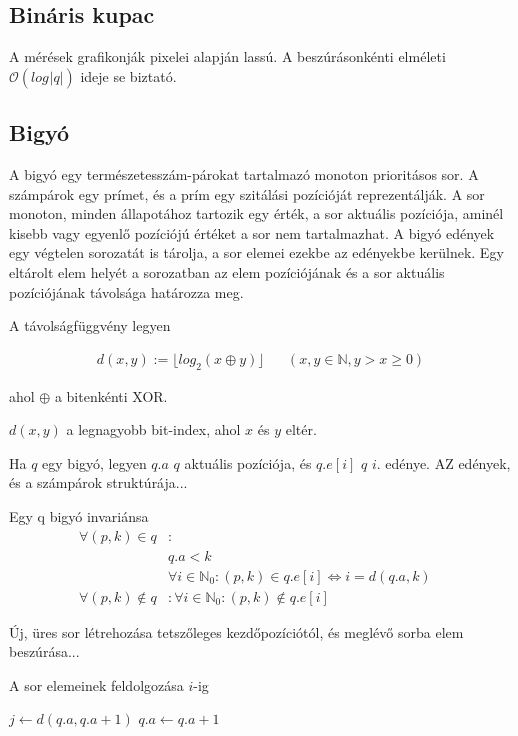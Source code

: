 \documentclass[12pt]{report}
\begin{document}
\subsection{Bináris kupac}

A mérések grafikonják pixelei alapján lassú. A beszúrásonkénti elméleti
$\mathcal{O}(log_{}{|q|})$ ideje se biztató.

\subsection{Bigyó}

A bigyó egy természetesszám-párokat tartalmazó monoton prioritásos sor.
A számpárok egy prímet, és a prím egy szitálási pozícióját reprezentálják.
A sor monoton, minden állapotához tartozik egy érték, a sor aktuális pozíciója,
aminél kisebb vagy egyenlő pozíciójú értéket a sor nem tartalmazhat.
A bigyó edények egy végtelen sorozatát is tárolja, a sor elemei ezekbe az edényekbe kerülnek.
Egy eltárolt elem helyét a sorozatban az elem pozíciójának
és a sor aktuális pozíciójának távolsága határozza meg.

A távolságfüggvény legyen

\begin{align*}
d(x, y) := \lfloor log_{2}{}(x \oplus y) \rfloor & & (x, y \in \mathbb{N}, y > x \ge 0)
\end{align*}

ahol $\oplus$ a bitenkénti XOR.

$d(x, y)$ a legnagyobb bit-index, ahol $x$ és $y$ eltér.

Ha $q$ egy bigyó, legyen $q.a$ $q$ aktuális pozíciója, és $q.e[i]$ $q$ $i$. edénye. AZ edények, és a számpárok struktúrája...

Egy q bigyó invariánsa
\begin{align*}
\forall (p, k) \in q &: &\\ 
	& q.a < k\\
	& \forall i \in \mathbb{N}_{0}: (p, k) \in q.e[i] \iff i=d(q.a, k) \\
\forall (p, k) \not\in q &: \forall i \in \mathbb{N}_{0}: (p, k) \not\in q.e[i]
\end{align*}

Új, üres sor létrehozása tetszőleges kezdőpozíciótól, és meglévő sorba elem beszúrása...

A sor elemeinek feldolgozása $i$-ig
\begin{algorithmic}[1]
	\State $j \gets d(q.a, q.a + 1)$
	\State $q.a \gets q.a + 1$
		\State {}
			\State {}
		\Else
			\State {}
		\EndIf
	\EndFor
\EndWhile
\end{algorithmic}
\end{document}
